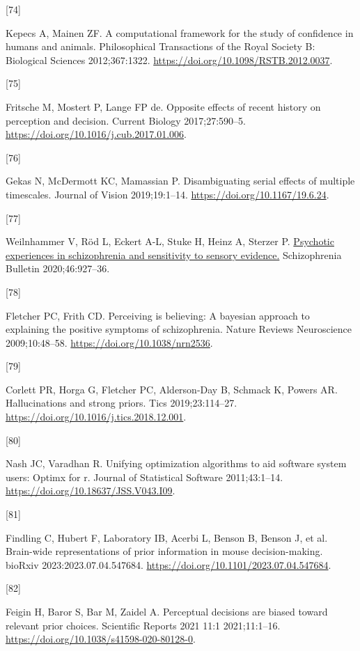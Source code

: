 \documentclass[
]{article}
\newlength{\cslhangindent}
\newlength{\csllabelwidth}
\newlength{\cslentryspacingunit} %
\newenvironment{CSLReferences}[2] %
 {%
  \setlength{\parindent}{0pt}
  \ifodd #1
  \let\oldpar\par
  \def\par{\hangindent=\cslhangindent\oldpar}
  \fi
  \setlength{\parskip}{#2\cslentryspacingunit}
 }%
 {}
\newcommand{\CSLLeftMargin}[1]{\parbox[t]{\csllabelwidth}{#1}}
\newcommand{\CSLRightInline}[1]{\parbox[t]{\linewidth - \csllabelwidth}{#1}\break}
\begin{document}
\begin{CSLReferences}{0}{0}
\leavevmode{}%
\CSLLeftMargin{{[}74{]} }%
\CSLRightInline{Kepecs A, Mainen ZF. A computational framework for the
study of confidence in humans and animals. Philosophical Transactions of
the Royal Society B: Biological Sciences 2012;367:1322.
\url{https://doi.org/10.1098/RSTB.2012.0037}.}

\leavevmode{}%
\CSLLeftMargin{{[}75{]} }%
\CSLRightInline{Fritsche M, Mostert P, Lange FP de. Opposite effects of
recent history on perception and decision. Current Biology
2017;27:590--5. \url{https://doi.org/10.1016/j.cub.2017.01.006}.}

\leavevmode{}%
\CSLLeftMargin{{[}76{]} }%
\CSLRightInline{Gekas N, McDermott KC, Mamassian P. Disambiguating
serial effects of multiple timescales. Journal of Vision 2019;19:1--14.
\url{https://doi.org/10.1167/19.6.24}.}

\leavevmode{}%
\CSLLeftMargin{{[}77{]} }%
\CSLRightInline{Weilnhammer V, Röd L, Eckert A-L, Stuke H, Heinz A,
Sterzer P. \href{https://www.ncbi.nlm.nih.gov/pubmed/32090246}{Psychotic
experiences in schizophrenia and sensitivity to sensory evidence.}
Schizophrenia Bulletin 2020;46:927--36.}

\leavevmode{}%
\CSLLeftMargin{{[}78{]} }%
\CSLRightInline{Fletcher PC, Frith CD. Perceiving is believing: A
bayesian approach to explaining the positive symptoms of schizophrenia.
Nature Reviews Neuroscience 2009;10:48--58.
\url{https://doi.org/10.1038/nrn2536}.}

\leavevmode{}%
\CSLLeftMargin{{[}79{]} }%
\CSLRightInline{Corlett PR, Horga G, Fletcher PC, Alderson-Day B,
Schmack K, Powers AR. Hallucinations and strong priors. Tics
2019;23:114--27. \url{https://doi.org/10.1016/j.tics.2018.12.001}.}

\leavevmode{}%
\CSLLeftMargin{{[}80{]} }%
\CSLRightInline{Nash JC, Varadhan R. Unifying optimization algorithms to
aid software system users: Optimx for r. Journal of Statistical Software
2011;43:1--14. \url{https://doi.org/10.18637/JSS.V043.I09}.}

\leavevmode{}%
\CSLLeftMargin{{[}81{]} }%
\CSLRightInline{Findling C, Hubert F, Laboratory IB, Acerbi L, Benson B,
Benson J, et al. Brain-wide representations of prior information in
mouse decision-making. bioRxiv 2023:2023.07.04.547684.
\url{https://doi.org/10.1101/2023.07.04.547684}.}

\leavevmode{}%
\CSLLeftMargin{{[}82{]} }%
\CSLRightInline{Feigin H, Baror S, Bar M, Zaidel A. Perceptual decisions
are biased toward relevant prior choices. Scientific Reports 2021 11:1
2021;11:1--16. \url{https://doi.org/10.1038/s41598-020-80128-0}.}

\end{CSLReferences}
\end{document}
